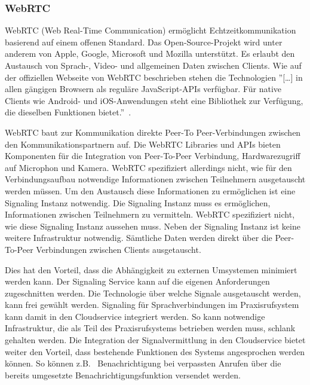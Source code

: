 \subsubsection{WebRTC}

WebRTC (Web Real-Time Communication) ermöglicht Echtzeitkommunikation basierend auf einem offenen Standard.
Das Open-Source-Projekt wird unter anderem von Apple, Google, Microsoft und Mozilla unterstützt.
Es erlaubt den Austausch von Sprach-, Video- und allgemeinen Daten zwischen Clients.
Wie auf der offiziellen Webseite von WebRTC beschrieben stehen die Technologien
''[\ldots] in allen gängigen Browsern als reguläre JavaScript-APIs verfügbar.
Für native Clients wie Android- und iOS-Anwendungen steht eine Bibliothek zur Verfügung, die dieselben Funktionen bietet.''~\cite{webrtc}.

WebRTC baut zur Kommunikation direkte Peer-To Peer-Verbindungen zwischen den Kommunikationspartnern auf.
Die WebRTC Libraries und APIs bieten Komponenten für die Integration von Peer-To-Peer Verbindung, Hardwarezugriff auf Microphon und Kamera.
WebRTC spezifiziert allerdings nicht, wie für den Verbindungsaufbau notwendige Informationen zwischen Teilnehmern ausgetauscht werden müssen.
Um den Austausch diese Informationen zu ermöglichen ist eine Signaling Instanz notwendig.
Die Signaling Instanz muss es ermöglichen, Informationen zwischen Teilnehmern zu vermitteln.
WebRTC spezifiziert nicht, wie diese Signaling Instanz aussehen muss.
Neben der Signaling Instanz ist keine weitere Infrastruktur notwendig.
Sämtliche Daten werden direkt über die Peer-To-Peer Verbindungen zwischen Clients ausgetauscht.

Dies hat den Vorteil, dass die Abhängigkeit zu externen Umsystemen minimiert werden kann.
Der Signaling Service kann auf die eigenen Anforderungen zugeschnitten werden.
Die Technologie über welche Signale ausgetauscht werden, kann frei gewählt werden.
Signaling für Sprachverbindungen im Praxisrufsystem kann damit in den Cloudservice integriert werden.
So kann notwendige Infrastruktur, die als Teil des Praxisrufsystems betrieben werden muss, schlank gehalten werden.
Die Integration der Signalvermittlung in den Cloudservice bietet weiter den Vorteil, dass bestehende Funktionen des Systems angesprochen werden können.
So können z.B. \ Benachrichtigung bei verpassten Anrufen über die bereits umgesetzte Benachrichtigungsfunktion versendet werden.

